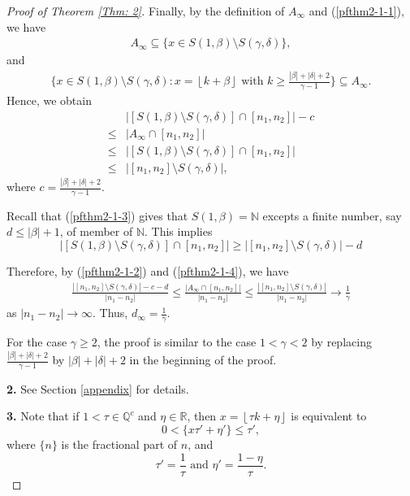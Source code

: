 \documentclass{amsart}
\theoremstyle{definition}
\numberwithin{equation}{section}%
\begin{document}
\begin{proof}[Proof of Theorem \ref{Thm: 2}]
Finally, by the definition of $A_\infty$ and (\ref{pfthm2-1-1}), we have
\begin{align*}
   A_\infty\subseteq\{x\in S(1,\beta)\setminus S(\gamma, \delta)\},
\end{align*}
and
\begin{align*}
   \{x\in S(1,\beta)\setminus S(\gamma, \delta): x=\left\lfloor k+\beta \right\rfloor\mbox{ with }k\geq \frac{|\beta|+|\delta|+2}{\gamma-1}\}\subseteq A_\infty.
\end{align*}
Hence, we obtain
\begin{equation}\label{pfthm2-1-2}
  \begin{aligned}
  &|[S(1, \beta)\setminus S(\gamma, \delta)]\cap [n_1, n_2]|-c \\
  \leq&  |A_\infty\cap [n_1, n_2]|\\
  \leq& |[S(1, \beta)\setminus S(\gamma, \delta)]\cap [n_1 , n_2]|\\
  \leq& |[n_1,n_2]\setminus S(\gamma, \delta)|,
\end{aligned}  
\end{equation}
where $c=\frac{|\beta|+|\delta|+2}{\gamma-1}$. 

Recall that (\ref{pfthm2-1-3}) gives that $S(1,\beta)=\mathbb{N}$ excepts a finite number, say $d\leq |\beta|+1$, of member of $\mathbb{N}$. This implies
\begin{equation}\label{pfthm2-1-4}
    |[S(1, \beta)\setminus S(\gamma, \delta)]\cap [n_1, n_2]|\geq |[n_1,n_2]\setminus S(\gamma, \delta)|-d
\end{equation}

Therefore, by (\ref{pfthm2-1-2}) and (\ref{pfthm2-1-4}), we have
\begin{align*}
   \frac{|[n_1,n_2]\setminus S(\gamma, \delta)|-c-d}{|n_1-n_2|}\leq  \frac{|A_\infty\cap [n_1, n_2]|}{|n_1-n_2|}\leq \frac{|[n_1,n_2]\setminus S(\gamma, \delta)|}{|n_1-n_2|}\to \frac{1}{\gamma}
\end{align*}
as $|n_1-n_2|\to\infty$. Thus, $d_\infty=\frac{1}{\gamma}$.

For the case $\gamma\geq 2$, the proof is similar to the case $1<\gamma <2$ by replacing $\frac{|\beta|+|\delta|+2}{\gamma-1}$ by $|\beta|+|\delta|+2$ in the beginning of the proof.

\item[\bf 2.] See Section \ref{appendix} for details.

\item[\bf 3.] Note that if $1<\tau\in \mathbb{Q}^c$ and $\eta\in \mathbb{R}$, then $x=\left\lfloor \tau k+\eta \right\rfloor$ is equivalent to 
\begin{equation*}
    0<\{x\tau'+\eta'\}\leq \tau',
\end{equation*}
where $\{n\}$ is the fractional part of $n$, and 
\begin{equation*}
    \tau'=\frac{1}{\tau}\mbox{ and }\eta'=\frac{1-\eta}{\tau}.
\end{equation*}


\end{proof}
\end{document}
